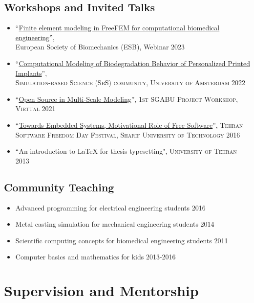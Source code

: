 \documentclass{cv}
\begin{document}
\subsection{Workshops and Invited Talks}

\begin{itemize}[itemsep=-0.2ex]
\item
``\href{https://www.youtube.com/watch?v=hCjS38lDocg}{Finite element modeling in FreeFEM for computational biomedical engineering}'',\\ European Society of Biomechanics (ESB), Webinar \hfill 2023
\item
``\href{https://www.youtube.com/watch?v=19iz0VEIvWU}{Computational Modeling of Biodegradation Behavior of Personalized Printed Implants}'',\\ \textsc{Simulation-based Science (SbS) community, University of Amsterdam} \hfill 2022
\item
``\href{https://www.youtube.com/watch?v=3nIExqK49n4}{Open Source in Multi-Scale Modeling}'', \textsc{1st SGABU Project Workshop, Virtual} \hfill 2021
\item
``\href{https://www.slideshare.net/tehsfd/embedded-system-70659214}{Towards Embedded Systems, Motivational Role of Free Software}'', \textsc{Tehran Software Freedom Day Festival, Sharif University of Technology} \hfill 2016
\item
``An introduction to \LaTeX{} for thesis typesetting", \textsc{University of Tehran} \hfill 2013
\end{itemize}


\subsection{Community Teaching}

\begin{itemize}[itemsep=-0.2ex]
\item
Advanced programming for electrical engineering students \hfill 2016
\item
Metal casting simulation for mechanical engineering students \hfill 2014
\item
Scientific computing concepts for biomedical engineering students \hfill 2011
\item
Computer basics and mathematics for kids \hfill 2013-2016
\end{itemize}


\section{Supervision and Mentorship}
\end{document}
